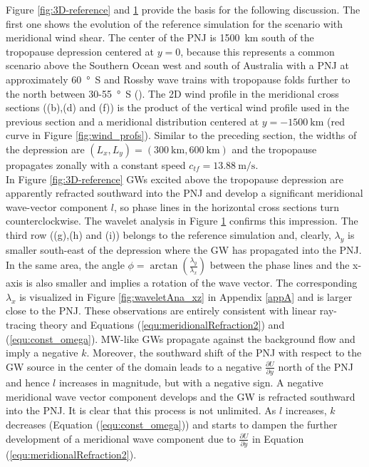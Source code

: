 \begin{figure}[tbp]
    \label{fig:waveletAna}
\end{figure}
Figure \ref{fig:3D-reference} and \ref{fig:waveletAna} provide the basis for the following discussion. The first one shows the evolution of the reference simulation for the scenario with meridional wind shear. The center of the PNJ is \SI{1500}{\kilo\meter} south of the tropopause depression centered at $y=0$, because this represents a common scenario above the Southern Ocean west and south of Australia with a PNJ at approximately \SI{60}{\degree S} and Rossby wave trains with tropopause folds further to the north between 30-\SI{55}{\degree S} (\cite[]{skerlak_tropopause_2015}). The 2D wind profile in the meridional cross sections ((b),(d) and (f)) is the product of the vertical wind profile used in the previous section and a meridional distribution centered at $y=\SI{-1500}{\kilo\meter}$ (red curve in Figure \ref{fig:wind_profs}). Similar to the preceding section, the widths of the depression are $(L_x,L_y)=(\SI{300}{\kilo\meter},\SI{600}{\kilo\meter})$ and the tropopause propagates zonally with a constant speed $c_{tf}=\SI{13.88}{\meter\per\second}$. \\
In Figure \ref{fig:3D-reference} GWs excited above the tropopause depression are apparently refracted southward into the PNJ and develop a significant meridional wave-vector component $l$, so phase lines in the horizontal cross sections turn counterclockwise. The wavelet analysis in Figure \ref{fig:waveletAna} confirms this impression. The third row ((g),(h) and (i)) belongs to the reference simulation and, clearly, $\lambda_y$ is smaller south-east of the depression where the GW has propagated into the PNJ. In the same area, the angle $\phi=\arctan(\frac{\lambda_y}{\lambda_x})$ between the phase lines and the x-axis is also smaller and implies a rotation of the wave vector. The corresponding $\lambda_x$ is visualized in Figure \ref{fig:waveletAna_xz} in Appendix \ref{appA} and is larger close to the PNJ. These observations are entirely consistent with linear ray-tracing theory and Equations (\ref{equ:meridionalRefraction2}) and (\ref{equ:const_omega}). MW-like GWs propagate against the background flow and imply a negative $k$. Moreover, the southward shift of the PNJ with respect to the GW source in the center of the domain leads to a negative $\frac{\partial U}{\partial y}$ north of the PNJ and hence $l$ increases in magnitude, but with a negative sign. A negative meridional wave vector component develops and the GW is refracted southward into the PNJ. It is clear that this process is not unlimited. As $l$ increases, $k$ decreases (Equation (\ref{equ:const_omega})) and starts to dampen the further development of a meridional wave component due to $\frac{\partial U}{\partial y}$ in Equation (\ref{equ:meridionalRefraction2}). \\
